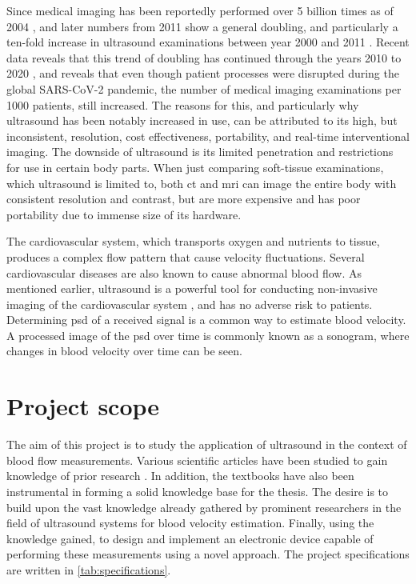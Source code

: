 Since medical imaging has been reportedly performed over 5 billion times as of 2004 \cite{Picano2004}, and later numbers from 2011 show a general doubling, and particularly a ten-fold increase in ultrasound examinations between year 2000 and 2011 \cite{Szabo_UltrasoundBook_2}. Recent data reveals that this trend of doubling has continued through the years 2010 to 2020 \cite{Winder2021}, and reveals that even though patient processes were disrupted during the global SARS-CoV-2 pandemic, the number of medical imaging examinations per 1000 patients, still increased. The reasons for this, and particularly why ultrasound has been notably increased in use, can be attributed to its high, but inconsistent, resolution, cost effectiveness, portability, and real-time interventional imaging. The downside of ultrasound is its limited penetration and restrictions for use in certain body parts. When just comparing soft-tissue examinations, which ultrasound is limited to, both \gls{ct} and \gls{mri} can image the entire body with consistent resolution and contrast, but are more expensive and has poor portability due to immense size of its hardware. 

The cardiovascular system, which transports oxygen and nutrients to tissue, produces a complex flow pattern that cause velocity fluctuations. Several cardiovascular diseases are also known to cause abnormal blood flow. As mentioned earlier, ultrasound is a powerful tool for conducting non-invasive imaging of the cardiovascular system \cite{JensenUltrasoundBook,Hansen_thesis}, and has no adverse risk to patients. Determining \gls{psd} of a received signal is a common way to estimate blood velocity. A processed image of the \gls{psd} over time is commonly known as a sonogram, where changes in blood velocity over time can be seen. 

\section{Project scope}
The aim of this project is to study the application of ultrasound in the context of blood flow measurements. Various scientific articles have been studied to gain knowledge of prior research \cite{Jensen_Analysis_PW_1996,Jansson_Estimation_Perfusion,Huang_Smartphone_2012,JanaSmartphone2020,DingPMUTs,Ding_PW_Pmut,Xu2007_Pulser,Matsuoka_Doppler_Rabbit,Fish_Ultrasonic,Williams2006,Winckler2012,Wang2016,Wang2019,Tsang2009,Govindan2016,Xu2007_Pulser,PICpulser}. In addition, the textbooks \cite{JensenUltrasoundBook,ShungUltrasound_Book,Szabo_UltrasoundBook_2} have also been instrumental in forming a solid knowledge base for the thesis. The desire is to build upon the vast knowledge already gathered by prominent researchers in the field of ultrasound systems for blood velocity estimation. Finally, using the knowledge gained, to design and implement an electronic device capable of performing these measurements using a novel approach. The project specifications are written in \cref{tab:specifications}.

